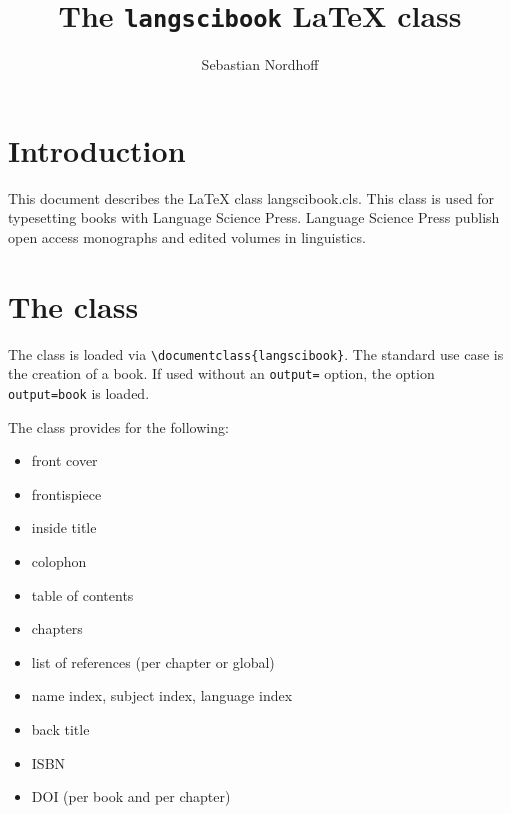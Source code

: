 \documentclass[%
output=guidelines,guidelines]{../langscibook}
\author{Sebastian Nordhoff}
\title{The \texttt{langscibook} {\LaTeX} class}
\subtitle{}
\begin{document}
\maketitle

\frontmatter
{} %
\tableofcontents
% 
% 
% 

\mainmatter
\chapter{Introduction}
This document describes the {\LaTeX} class langscibook.cls. This class is used for typesetting books with Language Science Press. Language Science Press publish open access monographs and edited volumes in linguistics.


\chapter{The class}
The class is loaded via \verb+\documentclass{langscibook}+. The standard use case is the creation of a book. If used without an \texttt{output=} option, the option \texttt{output=book} is loaded.

The class provides for the following:
\begin{itemize}
 \item front cover
 \item frontispiece
 \item inside title
 \item colophon
 \item table of contents
 \item chapters
 \item list of references (per chapter or global)
 \item name index, subject index, language index
 \item back title
 \item ISBN
 \item DOI (per book and per chapter)
\end{itemize}

\end{document}
